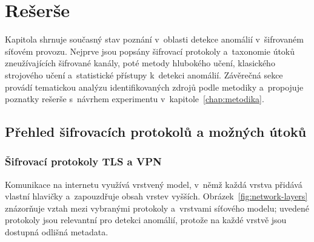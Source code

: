 \chapter{Rešerše}
\label{chap:reserse}

Kapitola shrnuje současný stav poznání v~oblasti detekce anomálií v~šifrovaném síťovém provozu. Nejprve jsou popsány šifrovací protokoly a~taxonomie útoků zneužívajících šifrované kanály, poté metody hlubokého učení, klasického strojového učení a~statistické přístupy k~detekci anomálií. Závěrečná sekce provádí tematickou analýzu identifikovaných zdrojů podle metodiky \textcite{Braun2006} a~propojuje poznatky rešerše s~návrhem experimentu v~kapitole~\ref{chap:metodika}.

\section{Přehled šifrovacích protokolů a možných útoků}
\label{sec:prehled-sifrovani}

\subsection{Šifrovací protokoly TLS a VPN}
\label{sec:sifrovaci-algoritmy}

Komunikace na internetu využívá vrstvený model, v~němž každá vrstva přidává vlastní hlavičky a~zapouzdřuje obsah vrstev vyšších. Obrázek~\ref{fig:network-layers} znázorňuje vztah mezi vybranými protokoly a~vrstvami síťového modelu; uvedené protokoly jsou relevantní pro detekci anomálií, protože na každé vrstvě jsou dostupná odlišná metadata.

